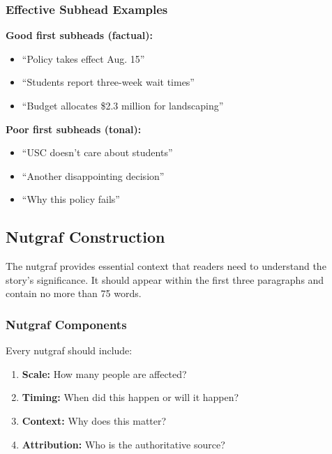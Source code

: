 \documentclass[12pt]{article}
\begin{document}
\subsubsection{Effective Subhead Examples}

\begin{afterbox}
\textbf{Good first subheads (factual):}
\begin{itemize}
    \item ``Policy takes effect Aug. 15''
    \item ``Students report three-week wait times''
    \item ``Budget allocates \$2.3 million for landscaping''
\end{itemize}
\end{afterbox}

\begin{beforebox}
\textbf{Poor first subheads (tonal):}
\begin{itemize}
    \item ``USC doesn't care about students''
    \item ``Another disappointing decision''
    \item ``Why this policy fails''
\end{itemize}
\end{beforebox}



\newpage
\subsection{Nutgraf Construction}
\label{sec:nutgraf-placement}

The nutgraf provides essential context that readers need to understand the story's significance. It should appear within the first three paragraphs and contain no more than 75 words.


\subsubsection{Nutgraf Components}

Every nutgraf should include:
\begin{enumerate}
    \item \textbf{Scale:} How many people are affected?
    \item \textbf{Timing:} When did this happen or will it happen?
    \item \textbf{Context:} Why does this matter?
    \item \textbf{Attribution:} Who is the authoritative source?
\end{enumerate}
\end{document}
